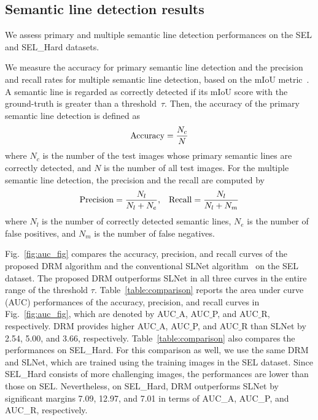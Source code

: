 \documentclass[runningheads]{llncs}
\begin{document}
\subsection{Semantic line detection results}
We assess primary and multiple semantic line detection performances on the SEL and SEL\_Hard datasets.

We measure the accuracy for primary semantic line detection and the precision and recall rates for multiple semantic line detection, based on the mIoU metric~\cite{lee2017}. A semantic line is regarded as correctly detected if its mIoU score with the ground-truth is greater than a threshold~$\tau$. Then, the accuracy of the primary semantic line detection is defined as
\begin{equation}\label{eq:acc}
    {\rm Accuracy} = \frac{N_c}{N}
\end{equation}
where $N_c$ is the number of the test images whose primary semantic lines are correctly detected, and $N$ is the number of all test images. For the multiple semantic line detection, the precision and the recall are computed by
\begin{equation}\label{eq:pre_rec}
    {\rm Precision} = \frac{N_l}{N_l + N_e}, \;\;\; {\rm Recall} = \frac{N_l}{N_l + N_m}
\end{equation}
where $N_l$ is the number of correctly detected semantic lines, $N_e$ is the number of false positives, and $N_m$ is the number of false negatives.


Fig.~\ref{fig:auc_fig} compares the accuracy, precision, and recall curves of the proposed DRM algorithm and the conventional SLNet algorithm~\cite{lee2017} on the SEL dataset. The proposed DRM outperforms SLNet in all three curves in the entire range of the threshold $\tau$. Table~\ref{table:comparison} reports the area under curve (AUC) performances of the accuracy, precision, and recall curves in Fig.~\ref{fig:auc_fig}, which are denoted by AUC$\_$A, AUC$\_$P, and AUC$\_$R, respectively. DRM provides higher AUC$\_$A, AUC$\_$P, and AUC$\_$R than SLNet by 2.54, 5.00, and 3.66, respectively. Table~\ref{table:comparison} also compares the performances on SEL\_Hard. For this comparison as well, we use the same DRM and SLNet, which are trained using the training images in the SEL dataset. Since SEL\_Hard consists of more challenging images, the performances are lower than those on SEL. Nevertheless, on SEL\_Hard, DRM outperforms SLNet by significant margins 7.09, 12.97, and 7.01 in terms of AUC\_A, AUC\_P, and AUC\_R, respectively.
\end{document}
